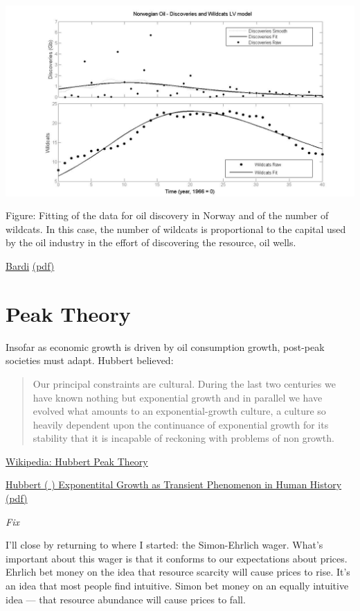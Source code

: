 \documentclass[
]{book}
\begin{document}
\includegraphics{fig/bardi_norwegian_oil.png}

Figure: Fitting of the data for oil discovery in Norway and of the number of wildcats. In
this case, the number of wildcats is proportional to the capital used by the oil industry in
the effort of discovering the resource, oil wells.

\href{https://www.mdpi.com/1996-1073/2/3/646}{Bardi}
\href{pdf/Bardi_2009_Hubbert_Resource_Extraction.pdf}{(pdf)}

\hypertarget{peak-theory}{%
\section{Peak Theory}\label{peak-theory}}

Insofar as economic growth is driven by oil consumption growth, post-peak societies must adapt. Hubbert believed:

\begin{quote}
Our principal constraints are cultural. During the last two centuries we have known nothing but exponential growth and in parallel we have evolved what amounts to an exponential-growth culture, a culture so heavily dependent upon the continuance of exponential growth for its stability that it is incapable of reckoning with problems of non growth.
\end{quote}

\href{https://en.wikipedia.org/wiki/Hubbert_peak_theory}{Wikipedia: Hubbert Peak Theory}

\href{pdf/Hubbert_Exponetial_Transient_Growth.pdf}{Hubbert ( ) Exponentital Growth as Transient Phenomenon in Human History (pdf)}

\emph{Fix}

I'll close by returning to where I started: the Simon-Ehrlich wager. What's important about this wager is that it conforms to our expectations about prices. Ehrlich bet money on the idea that resource scarcity will cause prices to rise. It's an idea that most people find intuitive. Simon bet money on an equally intuitive idea --- that resource abundance will cause prices to fall.
\end{document}
